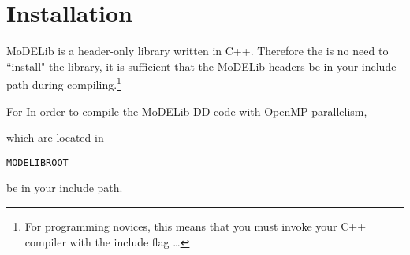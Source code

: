 \section{Installation}

MoDELib is a header-only library written in C++. Therefore the is no need to ``install" the library, it is  sufficient that the MoDELib headers be in your include path during compiling.\footnote{For programming novices, this means that you must invoke your C++ compiler with the include flag \ldots } 

For In order to compile the MoDELib DD code with OpenMP parallelism, 

which are located in  
\begin{verbatim}
MODELIBROOT\end{verbatim}
 be in your include path.
%












